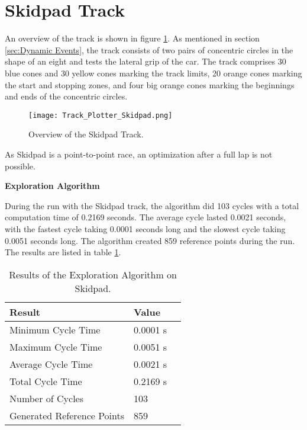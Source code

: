 \pagebreak

\section{Skidpad Track} \label{sec:Results Skidpad Track}
An overview of the track is shown in figure \ref{fig:Results Skidpad Initial}. As mentioned in section \ref{sec:Dynamic Events}, the track consists of two pairs of concentric circles in the shape of an eight and tests the lateral grip of the car. The track comprises 30 blue cones and 30 yellow cones marking the track limits, 20 orange cones marking the start and stopping zones, and four big orange cones marking the beginnings and ends of the concentric circles.
\begin{figure}[H]
    \centering
    \texttt{[image: Track\_Plotter\_Skidpad.png]}
    \caption{Overview of the Skidpad Track.}
    \label{fig:Results Skidpad Initial}
\end{figure}

As Skidpad is a point-to-point race, an optimization after a full lap is not possible.

\textbf{Exploration Algorithm}

During the run with the Skidpad track, the algorithm did 103 cycles with a total computation time of 0.2169 seconds. The average cycle lasted 0.0021 seconds, with the fastest cycle taking 0.0001 seconds long and the slowest cycle taking 0.0051 seconds long. The algorithm created 859 reference points during the run. The results are listed in table \ref{tab:Results Skidpad Exploration}.

\begin{table}[H]
    \centering
    \begin{tabular}{|l|l|l|}
        \hline
        \textbf{Result}            & \textbf{Value} \\ \hline
        Minimum Cycle Time         & 0.0001 s       \\ \hline
        Maximum Cycle Time         & 0.0051 s       \\ \hline
        Average Cycle  Time        & 0.0021 s       \\ \hline
        Total Cycle Time           & 0.2169 s       \\ \hline
        Number of Cycles           & 103            \\ \hline
        Generated Reference Points & 859            \\ \hline
    \end{tabular}
    \caption{Results of the Exploration Algorithm on Skidpad.}
    \label{tab:Results Skidpad Exploration}
\end{table}

